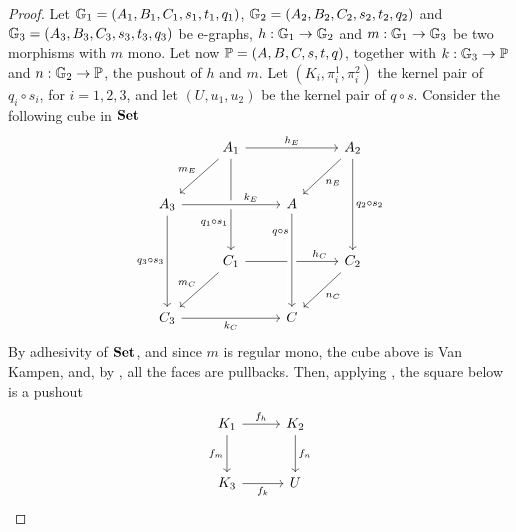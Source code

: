 \begin{proof}
	Let $\mathbb{G}_1 = (A_1, B_1, C_1, s_1, t_1, q_1)$, $\mathbb{G}_2 = (A_2, B_2, C_2, s_2, t_2, q_2)$ and $\mathbb{G}_3 = (A_3, B_3, C_3, s_3, t_3, q_3)$ be e-graphs,  $h: \mathbb{G}_1 \to \mathbb{G}_2$ and $m: \mathbb{G}_1 \to \mathbb{G}_3$ be two morphisms with $m$ mono. Let now $\mathbb{P} = (A, B, C, s, t, q)$, together with $k: \mathbb{G}_3 \to \mathbb{P}$ and $n: \mathbb{G}_2 \to \mathbb{P}$, the pushout of $h$ and $m$.
	Let $(K_i, \pi_i^1, \pi_i^2)$ the kernel pair of $q_i\circ s_i$, for $i = 1, 2, 3$, and let $(U, u_1, u_2)$ be the kernel pair of $q \circ s$.
	Consider the following cube in $\mathbf{Set}$
	\[\begin{tikzcd}[row sep=25, column sep = 25]
	& {A_1} && {A_2} \\
	{A_3} && A \\
	& {C_1} && {C_2} \\
	{C_3} && C
	\arrow["{h_E}", from=1-2, to=1-4]
	\arrow["{m_E}"', from=1-2, to=2-1]
	\arrow["{q_1\circ s_1}"'{pos=0.7}, from=1-2, to=3-2]
	\arrow["{n_E}", from=1-4, to=2-3]
	\arrow["{q_2\circ s_2}", from=1-4, to=3-4]
	\arrow["{k_E}"{pos=0.7}, from=2-1, to=2-3, crossing over]
	\arrow["{q_3\circ s_3}"', from=2-1, to=4-1]
	\arrow["{h_C}"{pos=0.8}, from=3-2, to=3-4]
	\arrow["{m_C}"', from=3-2, to=4-1]
	\arrow["{n_C}", from=3-4, to=4-3]
	\arrow["{k_C}"', from=4-1, to=4-3]
	\arrow["{q\circ s}"'{pos=0.2}, from=2-3, to=4-3, crossing over]
	\end{tikzcd}\]
	By adhesivity of $\mathbf{Set}$, and since $m$ is regular mono, the cube above is Van Kampen, and, by , all the faces are pullbacks. Then, applying , the square below is a pushout
	\[\begin{tikzcd}[row sep=27, column sep = 27]
		K_1 \ar[r, "{f_h}"] \ar[d, "{f_m}"swap] & K_2 \ar[d, "{f_n}"] \\
		K_3 \ar[r, "{f_k}"swap] & U
	\end{tikzcd}\]


\end{proof}
